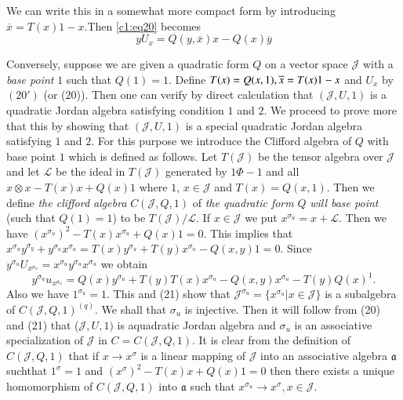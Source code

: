 We can write this in a somewhat more compact form by introducing
$\overline{x}=T(x)1-x$.\pageoriginale Then \eqref{c1:eq20} becomes
\begin{equation*}
  yU_x=Q(y,\overline{x})x-Q(x)\overline{y}\tag*{20'}
\end{equation*}

Conversely, suppose we are given a quadratic form $Q$ on a vector
space $\mathscr{J}$ with a {\em base point} $1$ such that
$Q(1)=1$. Define $T(x)=Q(x, 1),\overline{x}=T(x)1-x$ and $U_x$ by $(20')$ (or
($20$)). Then one can verify by direct calculation that
$(\mathscr{J},U,1)$ is a quadratic Jordan algebra satisfying condition
$1$ and $2$. We proceed to prove more that this by showing that
$(\mathscr{J},U,1)$ is a special quadratic Jordan algebra satisfying
$1$ and $2$. For this purpose we introduce the Clifford algebra of $Q$
with base point $1$ which is defined as follows. Let $T(\mathscr{J})$
be the tensor algebra over $\mathscr{J}$ and let $\mathscr{L}$  be the
ideal in $T(\mathscr{J})$ generated by $1\Phi -1$ and all $x \otimes
x-T(x)x+Q(x)1$ where $1$, $x\in \mathscr{J}$ and
$T(x)=Q(x,1)$. Then we define {\em the clifford algebra}
$C(\mathscr{J},Q,1)$ of {\em the quadratic form} $Q$ {\em will base
  point} (such that $Q(1)=1$) to be $T(\mathscr{J})/\mathscr{L}$. If
$x\in \mathscr{J}$ we put $x^{\sigma_u}= x+\mathscr{L}$. Then we
have $(x^{\sigma_u})^{2}-T(x)x^{\sigma_u}+Q(x)1=0$. This implies that
$x^{\sigma_u} y^{\sigma_y}+y^{\sigma_u} x^{\sigma_u}=T(x)y^{\sigma
  _u}+T(y)x^{\sigma_u}-Q(x,y)1=0$. Since $y^{\sigma_u}U_{x^{\sigma
    _u}}=x^{\sigma_u} y^{\sigma_u} x^{\sigma_u}$ we obtain
\begin{equation*}
y^{\sigma_u}u_{x^{\sigma_u}}=Q(x)y^{\sigma_u}+T(y)T(x)x^{\sigma
  _u}-Q(x,y)x^{\sigma_u}-T(y)Q(x)^{1}.\tag{21}\label{c1:eq21}
\end{equation*}
Also we have $1^{\sigma_u}=1$. This and (21) show that
$\mathscr{J}^{\sigma_u}=\{x^{\sigma_u}|x\in \mathscr{J}\}$ is a
subalgebra of $C(\mathscr{J}, Q, 1)^{(q)}$. We shall that $\sigma_u$
is injective. Then it will follow from (20) and (21) that
($\mathscr{J}, U,1)$ is a\pageoriginale quadratic Jordan algebra and
$\sigma_u$ is an associative specialization of $\mathscr{J}$ in
$C=C(\mathscr{J},Q,1)$. It is clear from the definition of
$C(\mathscr{J},Q,1)$  that if $x\to x^{\sigma}$ is a linear mapping of
$\mathscr{J}$ into an associative algebra $\mathfrak{a}$ suchthat
$1^{\sigma}=1$ and $(x^{\sigma})^{2}-T(x)x+Q(x)1=0$ then there exists a
  unique homomorphism of $C(\mathscr{J}, Q, 1)$ into $\mathfrak{a}$
  such that $x^{\sigma_u}\to x^{\sigma}, x\in \mathscr{J}$.

